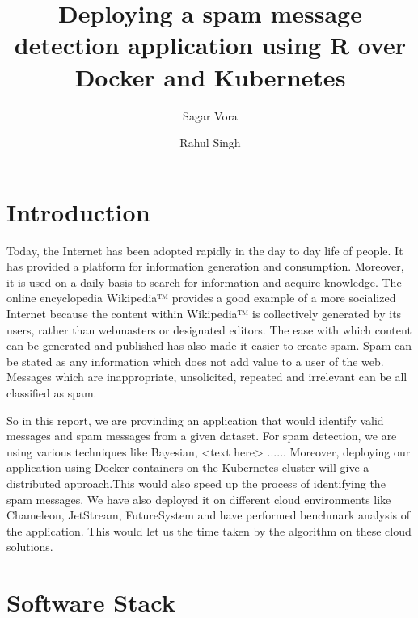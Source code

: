 \documentclass[9pt,twocolumn,twoside]{../../styles/osajnl}
\title{Deploying a spam message detection application using R over Docker and Kubernetes}
\author[1,*]{Sagar Vora}
\author[1]{Rahul Singh}
\affil[1]{School of Informatics and Computing, Bloomington, IN 47408, U.S.A.}
\affil[*]{Corresponding authors: vorasagar7@gmail.com, rahul\textunderscore singh919@yahoo.com}
\begin{document}
\maketitle

\section{Introduction}

Today, the Internet \cite{www-internet} has been adopted rapidly in
the day to day life of people. It has provided a platform for
information generation and consumption. Moreover, it is used on a
daily basis to search for information and acquire knowledge. The
online encyclopedia Wikipedia™ \cite{www-wikipedia} provides a good
example of a more socialized Internet because the content within
Wikipedia™ is collectively generated by its users, rather than
webmasters or designated editors. The ease with which content can be
generated and published has also made it easier to create spam. Spam
can be stated as any information which does not add value to a user of
the web. Messages which are inappropriate, unsolicited, repeated and
irrelevant can be all classified as spam.

\noindent
So in this report, we are provinding an application that would
identify valid messages and spam messages from a given dataset. For
spam detection, we are using various techniques like Bayesian, <text
here> ...... Moreover, deploying our application using Docker
\cite{www-docker-about} containers on the Kubernetes
\cite{www-kubernetes} cluster will give a distributed approach.This
would also speed up the process of identifying the spam messages. We
have also deployed it on different cloud environments like Chameleon,
JetStream, FutureSystem and have performed benchmark analysis of the
application. This would let us the time taken by the algorithm on
these cloud solutions.

\section{Software Stack}
\end{document}
